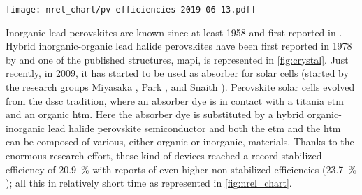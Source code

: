 \begin{SCfigure}
	\centering
	\texttt{[image: nrel\_chart/pv-efficiencies-2019-06-13.pdf]}
	\label{fig:nrel_chart}
\end{SCfigure}

	Inorganic lead perovskites are known since at least 1958 and first reported in .
	Hybrid inorganic\hyp{}organic lead halide perovskites have been first reported in 1978 by  and one of the published structures, \gls{mapi}, is represented in \cref{fig:crystal}.
	Just recently, in 2009, it has started to be used as absorber for solar cells (started by the research groups Miyasaka \cite{Kojima2009}, Park \cite{Im2011a,Kim2012b}, and Snaith \cite{Lee2012}).
	Perovskite solar cells evolved from the \gls{dssc} tradition, where an absorber dye is in contact with a titania \gls{etm} and an organic \gls{htm}.
	Here the absorber dye is substituted by a hybrid organic-inorganic lead halide perovskite semiconductor and both the \gls{etm} and the \gls{htm} can be composed of various, either organic or inorganic, materials.
	Thanks to the enormous research effort, these kind of devices reached a record stabilized efficiency of 20.9~\% \cite{Green2019} with reports of even higher non-stabilized efficiencies (23.7~\% \cite{Green2019,Jiang2017}); all this in relatively short time as represented in \cref{fig:nrel_chart}.



\begin{figure}
\end{figure}


